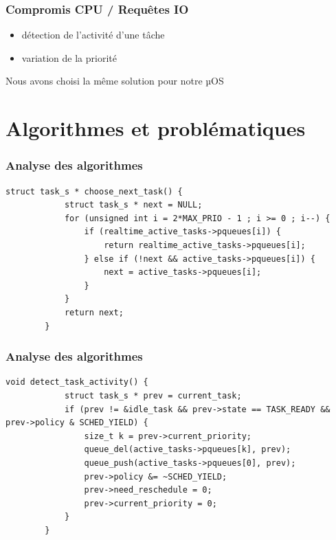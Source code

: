 \documentclass{beamer}
\begin{document}
\begin{frame}
    \frametitle{Compromis CPU / Requêtes IO}

    \begin{itemize}
        \item détection de l'activité d'une tâche
        \item variation de la priorité
    \end{itemize}

    Nous avons choisi la même solution pour notre µOS
\end{frame}

\section{Algorithmes et problématiques}

\begin{frame}[fragile]
    \frametitle{Analyse des algorithmes}

    \begin{lstlisting}[caption=Choix de la prochaine tâche à exécuter]
        struct task_s * choose_next_task() {
            struct task_s * next = NULL;
            for (unsigned int i = 2*MAX_PRIO - 1 ; i >= 0 ; i--) {
                if (realtime_active_tasks->pqueues[i]) {
                    return realtime_active_tasks->pqueues[i];
                } else if (!next && active_tasks->pqueues[i]) {
                    next = active_tasks->pqueues[i];
                }
            }
            return next;
        }
    \end{lstlisting}
\end{frame}

\begin{frame}[fragile]
    \frametitle{Analyse des algorithmes}

    \begin{lstlisting}[caption=Détection de l'activité d'une tâche (IO/CPU)]
        void detect_task_activity() {
            struct task_s * prev = current_task;
            if (prev != &idle_task && prev->state == TASK_READY && prev->policy & SCHED_YIELD) {
                size_t k = prev->current_priority;
                queue_del(active_tasks->pqueues[k], prev);
                queue_push(active_tasks->pqueues[0], prev);
                prev->policy &= ~SCHED_YIELD;
                prev->need_reschedule = 0;
                prev->current_priority = 0;
            }
        }
    \end{lstlisting}
\end{frame}
\end{document}
